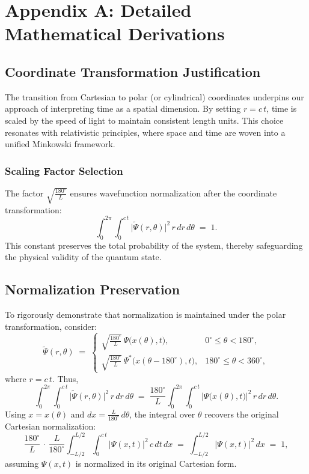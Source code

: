 \documentclass{article}
\begin{document}

% 
% 



\newpage
\appendix

\section{Appendix A: Detailed Mathematical Derivations}
\label{appendix:A}

\subsection{Coordinate Transformation Justification}
The transition from Cartesian to polar (or cylindrical) coordinates underpins our approach of interpreting time as a spatial dimension. By setting \( r = c\,t \), time is scaled by the speed of light to maintain consistent length units. This choice resonates with relativistic principles, where space and time are woven into a unified Minkowski framework.

\subsubsection{Scaling Factor Selection}
The factor \(\sqrt{\frac{180^\circ}{L}}\) ensures wavefunction normalization after the coordinate transformation:
\[
\int_{0}^{2\pi} \int_{0}^{c\,t} \bigl|\tilde{\Psi}(r,\theta)\bigr|^2 \,r\,dr\,d\theta \;=\; 1.
\]
This constant preserves the total probability of the system, thereby safeguarding the physical validity of the quantum state.

\subsection{Normalization Preservation}
To rigorously demonstrate that normalization is maintained under the polar transformation, consider:
\[
\tilde{\Psi}(r, \theta) \;=\;
\begin{cases}
\sqrt{\frac{180^\circ}{L}} \,\Psi\bigl(x(\theta), t\bigr), & 0^\circ \le \theta < 180^\circ, \\[6pt]
\sqrt{\frac{180^\circ}{L}} \,\Psi^*\bigl(x(\theta - 180^\circ), t\bigr), & 180^\circ \le \theta < 360^\circ,
\end{cases}
\]
where \(r = c\,t\). Thus,
\[
\int_{0}^{2\pi} \!\int_{0}^{c\,t} \bigl|\tilde{\Psi}(r,\theta)\bigr|^2 \,r\,dr\,d\theta
\;=\;
\frac{180^\circ}{L}
\int_{0}^{2\pi} \!\int_{0}^{c\,t}
\bigl|\Psi\bigl(x(\theta), t\bigr)\bigr|^2 \,r\,dr\,d\theta.
\]
Using \(x = x(\theta)\) and \(dx = \tfrac{L}{180^\circ}\,d\theta\), the integral over \(\theta\) recovers the original Cartesian normalization:
\[
\frac{180^\circ}{L} \,\cdot\,\frac{L}{180^\circ}
\int_{-L/2}^{L/2} \!\int_{0}^{c\,t}
\bigl|\Psi(x,t)\bigr|^2 \,c\,dt\,dx
\;=\;
\int_{-L/2}^{L/2} \!\bigl|\Psi(x,t)\bigr|^2\,dx
\;=\; 1,
\]
assuming \(\Psi(x,t)\) is normalized in its original Cartesian form.
\end{document}
